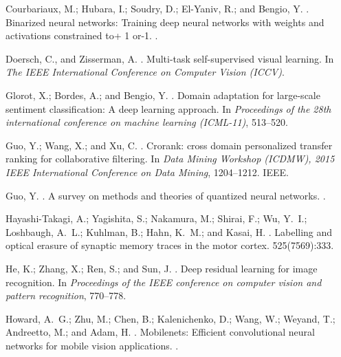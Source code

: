 \documentclass[letterpaper]{article} \usepackage{aaai19}  \usepackage{times}  \usepackage{helvet}  \usepackage{courier}  \usepackage{url}  \usepackage{graphicx}  \usepackage{amssymb}
\begin{document}
\begin{thebibliography}{}
Courbariaux, M.; Hubara, I.; Soudry, D.; El-Yaniv, R.; and Bengio, Y.
.
\newblock Binarized neural networks: Training deep neural networks with weights
  and activations constrained to+ 1 or-1.
.

Doersch, C., and Zisserman, A.
.
\newblock Multi-task self-supervised visual learning.
\newblock In {\em The IEEE International Conference on Computer Vision (ICCV)}.

Glorot, X.; Bordes, A.; and Bengio, Y.
.
\newblock Domain adaptation for large-scale sentiment classification: A deep
  learning approach.
\newblock In {\em Proceedings of the 28th international conference on machine
  learning (ICML-11)},  513--520.

Guo, Y.; Wang, X.; and Xu, C.
.
\newblock Crorank: cross domain personalized transfer ranking for collaborative
  filtering.
\newblock In {\em Data Mining Workshop (ICDMW), 2015 IEEE International
  Conference on Data Mining},  1204--1212.
\newblock IEEE.

Guo, Y.
.
\newblock A survey on methods and theories of quantized neural networks.
.

Hayashi-Takagi, A.; Yagishita, S.; Nakamura, M.; Shirai, F.; Wu, Y.~I.;
  Loshbaugh, A.~L.; Kuhlman, B.; Hahn, K.~M.; and Kasai, H.
.
\newblock Labelling and optical erasure of synaptic memory traces in the motor
  cortex.
 525(7569):333.

He, K.; Zhang, X.; Ren, S.; and Sun, J.
.
\newblock Deep residual learning for image recognition.
\newblock In {\em Proceedings of the IEEE conference on computer vision and
  pattern recognition},  770--778.

Howard, A.~G.; Zhu, M.; Chen, B.; Kalenichenko, D.; Wang, W.; Weyand, T.;
  Andreetto, M.; and Adam, H.
.
\newblock Mobilenets: Efficient convolutional neural networks for mobile vision
  applications.
.


\end{thebibliography}
\end{document}
